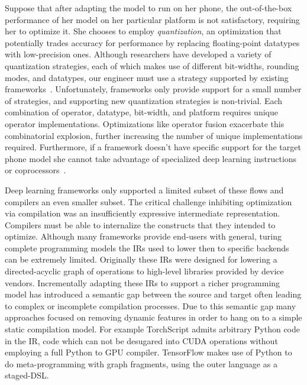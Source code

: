 Suppose that after adapting the model to run on her phone,
  the out-of-the-box performance of her
  model on her particular platform is not satisfactory, requiring her to optimize it.
She chooses to employ \textit{quantization}, an optimization that
  potentially trades accuracy for performance by replacing
  floating-point datatypes with low-precision ones.
Although researchers have developed a variety of quantization
  strategies, each of which makes use of different bit-widths, rounding
  modes, and datatypes, our engineer must use a strategy supported
  by existing frameworks~\citep{gustafson2015end, tf_lite_ops_compat, glow_quant}.
Unfortunately, frameworks only provide support for a small number
  of strategies, and supporting new quantization strategies is non-trivial.
Each combination of operator, datatype, bit-width, and
  platform requires unique operator implementations.
Optimizations like operator fusion exacerbate this combinatorial explosion,
  further increasing the number of unique implementations required.
Furthermore, if a framework doesn't have specific support for
  the target phone model she cannot take advantage of specialized deep learning
  instructions or coprocessors~\citep{apple_neural_engine}.

Deep learning frameworks only supported a limited subset of these flows
  and compilers an even smaller subset.
The critical challenge inhibiting optimization via compilation
  was an insufficiently expressive intermediate representation.
Compilers must be able to internalize the constructs
  that they intended to optimize.
Although many frameworks provide end-users with general, turing
  complete programming models the IRs used to lower then to specific
  backends can be extremely limited.
Originally these IRs were designed for lowering a directed-acyclic
  graph of operations to high-level libraries provided by device vendors.
Incrementally adapting these IRs to support a richer programming
  model has introduced a semantic gap between the source and target often
  leading to complex or incomplete compilation processes.
Due to this semantic gap many approaches focused on removing dynamic features in
  order to hang on to a simple static compilation model.
For example TorchScript admits arbitrary Python code in the IR,
  code which can not be desugared into CUDA operations without employing
  a full Python to GPU compiler.
TensorFlow makes use of Python to do meta-programming with graph fragments,
  using the outer language as a staged-DSL.

